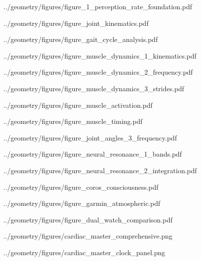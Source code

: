 ../geometry/figures/figure_1_perception_rate_foundation.pdf



../geometry/figures/figure_joint_kinematics.pdf

../geometry/figures/figure_gait_cycle_analysis.pdf

../geometry/figures/figure_muscle_dynamics_1_kinematics.pdf

../geometry/figures/figure_muscle_dynamics_2_frequency.pdf

../geometry/figures/figure_muscle_dynamics_3_strides.pdf

../geometry/figures/figure_muscle_activation.pdf

../geometry/figures/figure_muscle_timing.pdf

../geometry/figures/figure_joint_angles_3_frequency.pdf



../geometry/figures/figure_neural_resonance_1_bands.pdf

../geometry/figures/figure_neural_resonance_2_integration.pdf



../geometry/figures/figure_coros_consciousness.pdf

../geometry/figures/figure_garmin_atmospheric.pdf

../geometry/figures/figure_dual_watch_comparison.pdf



../geometry/figures/cardiac_master_comprehensive.png

../geometry/figures/cardiac_master_clock_panel.png



